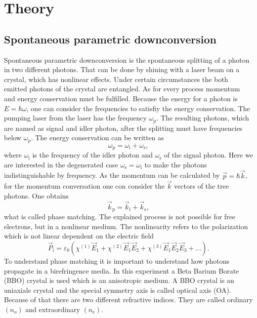 \section{Theory}\label{sec:theory}
\subsection{Spontaneous parametric downconversion}\label{sec:SPD}
Spontaneous parametric downconversion is the spontaneous splitting of a photon in two different photons. That can be done by shining with a laser beam on a crystal, which has nonlinear effects. Under certain circumstances the both emitted photons of the crystal are entangled. 
As for every process momentum and energy conservation must be fulfilled. Because the energy for a photon is $E = \hbar \omega$, one can consider the frequencies to satisfiy the energy conservation. The pumping laser from the laser has the frequency $\omega_{\mathrm{p}}$. The resulting photons, which are named as signal and idler photon, after the splitting must have frequencies below $\omega_{\mathrm{p}}$. The energy conservation can be written as
\begin{equation}
    \omega_{\mathrm{p}} = \omega_{\mathrm{i}} + \omega_{\mathrm{s}},
\end{equation}
where $\omega_{\mathrm{i}}$ is the frequency of the idler photon and $\omega_{\mathrm{s}}$ of the signal photon. Here we are interested in the degenerated case $ \omega_{\mathrm{s}} = \omega_{\mathrm{i}}$ to make the photons indistinguishable by frequency. 
As the momentum can be calculated by $\vec{p} = \hbar \vec{k}$, for  the momentum conversation one con consider the $\vec{k}$ vectors of the tree photons. One obtains
\begin{equation}
    \vec{k}_{\mathrm{p}} =  \vec{k}_{\mathrm{i}}  + \vec{k}_{\mathrm{s}},
    \label{eq:phase_matching}
\end{equation}
what is called phase matching. 
The explained process is not possible for free electrons, but in a nonlinear medium. The nonlinearity refers to the polarization which is not linear dependent on the electric field
\begin{equation}
    \vec{P}_{\mathrm{i}} = \varepsilon_0 \left( 
      \chi^{(1)} \vec{E}_1 
    + \chi^{(2)} \vec{E}_1 \vec{E}_2 
    + \chi^{(3)} \vec{E}_1 \vec{E}_2 \vec{E}_3 + ... 
    \right).
\end{equation}
To understand phase matching it is important to understand how photons propagate in a birefringence media. In this experiment a Beta Barium Borate (BBO) crystal is used which is an anisotropic medium. A BBO crystal is an uniaxiale crystal and the special symmetry axis is called optical axis (OA).  Because of that there are two different refractive indices. They are called ordinary $(n_{\mathrm{o}})$ and extraordinary $(n_{\mathrm{e}})$. 
